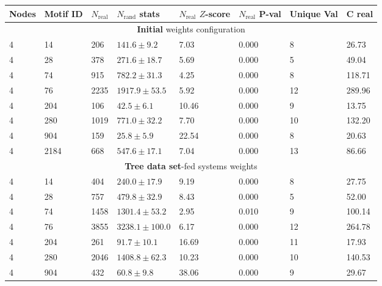 \documentclass[a4paper,12pt]{article}
\begin{document}
\begin{table}[h!]
	\begin{center}
		\begin{tabular}{||p{1cm} | p{1cm} | p{1cm} | p{2.5cm} | p{1.5cm} | p{1.5cm} | p{1cm} | p{1.5cm}||}			
			\hline
			Nodes & Motif ID & $N_{\text{real}}$ & $N_{\text{rand}}$ stats & $N_{\text{real}}$ $Z$-score &  $N_{\text{real}}$ P-val & Unique Val & C real \\
			\hline \hline
			\multicolumn{8}{c}{\textbf{Initial} weights configuration} \\
			\hline
			4 & 14 & 206 & $ 141.6\pm9.2$ & 7.03 & 0.000 &  8  & 26.73   \\
			4 & 28   &   378   & $   271.6\pm18.7   $ &   5.69    &  0.000   &   5    &  49.04     \\ 
			4 & 74   &   915   & $   782.2\pm31.3   $ &   4.25    &  0.000   &   8    &  118.71    \\
			4 & 76   &   2235  & $    1917.9\pm53.5 $ &     5.92  &    0.000 &     12 &     289.96 \\
			4 & 204  &    106  & $    42.5\pm6.1    $ &  10.46    &  0.000   &   9    &  13.75     \\
			4 & 280  &    1019 & $     771.0\pm32.2 $ &     7.70  &    0.000 &     10 &     132.20 \\
			4 & 904  &    159  & $    25.8\pm5.9    $ &  22.54    &  0.000   &   8    &  20.63     \\
			4 & 2184 &     668 & $     547.6\pm17.1 $ &     7.04  &    0.000 &     13 &     86.66  \\
			\hline \hline
			\multicolumn{8}{c}{\textbf{Tree data set}-fed systems weights} \\
			\hline
			4 & 14    &  404    & $ 240.0\pm17.9    $ &     9.19   &   0.000    &  8    &  27.75    \\
			4 & 28    &  757    & $ 479.8\pm32.9    $ &     8.43   &   0.000    &  5    &  52.00    \\
			4 & 74    &  1458   & $  1301.4\pm53.2  $ &    2.95    &  0.010     & 9     & 100.14    \\
			4 & 76    &  3855   & $  3238.1\pm100.0 $ &     6.17   &   0.000    &  12   &   264.78  \\
			4 & 204   &   261   & $  91.7\pm10.1    $ &     16.69  &    0.000   &   11  &    17.93  \\
			4 & 280   &   2046  & $   1408.8\pm62.3 $ &     10.23  &    0.000   &   10  &    140.53 \\ 
			4 & 904   &   432   & $  60.8\pm9.8     $ &      38.06 &     0.000  &    9  &    29.67  \\

\end{tabular}
\end{center}
\end{table}
\end{document}
